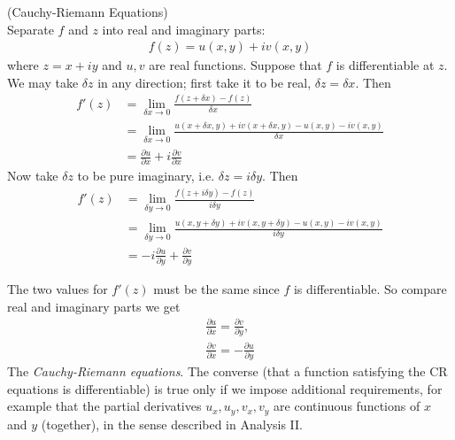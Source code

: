 \documentclass[a4paper]{article}
\begin{document}
\begin{thm} (Cauchy-Riemann Equations)\\
Separate $f$ and $z$ into real and imaginary parts:
\begin{equation*}
\begin{aligned}
f(z)=u(x,y)+iv(x,y)
\end{aligned}
\end{equation*}
where $z=x+iy$ and $u,v$ are real functions. Suppose that $f$ is differentiable at $z$. We may take $\delta z$ in any direction; first take it to be real, $\delta z = \delta x$. Then
\begin{equation*}
\begin{aligned}
f'(z) &= \lim_{\delta x \to 0} \frac{f(z+\delta x) - f(z)}{\delta x}\\
&=\lim_{\delta x\to 0} \frac{u(x+\delta x,y)+iv(x+\delta x,y) - u(x,y) - iv(x,y)}{\delta x}\\
&= \frac{\partial u}{\partial x} + i \frac{\partial v}{\partial x}
\end{aligned}
\end{equation*}
Now take $\delta z$ to be pure imaginary, i.e. $\delta z = i\delta y$. Then
\begin{equation*}
\begin{aligned}
f'(z) &= \lim_{\delta y \to 0} \frac{f(z+i\delta y) - f(z)}{i\delta y}\\
&= \lim_{\delta y \to 0} \frac{u(x,y+\delta y) + iv(x,y+\delta y) - u(x,y) - iv(x,y)}{i\delta y}\\
&= -i \frac{\partial u}{\partial y} + \frac{\partial v}{\partial y}
\end{aligned}
\end{equation*}

The two values for $f'(z)$ must be the same since $f$ is differentiable. So compare real and imaginary parts we get
\begin{equation*}
\begin{aligned}
\frac{\partial u}{\partial x} = \frac{\partial v}{\partial y},\\
\frac{\partial v}{\partial x} = -\frac{\partial u}{\partial y}
\end{aligned}
\end{equation*}
The \emph{Cauchy-Riemann equations}. The converse (that a function satisfying the CR equations is differentiable) is true only if we impose additional requirements, for example that the partial derivatives $u_x,u_y,v_x,v_y$ are continuous functions of $x$ and $y$ (together), in the sense described in Analysis II.
\end{thm}
\end{document}

